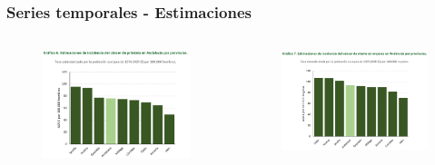\documentclass{beamer}
\begin{document}
\begin{frame}
\begin{columns}
\begin{column}{0.5\textwidth}
\begin{figure}
			\end{figure}
		\end{column}
	\end{columns}

\end{frame}



\begin{frame}\frametitle{Series temporales - Estimaciones}
	
	\begin{columns}
		\begin{column}{0.5\textwidth}
			\begin{figure}
				\centering
				\includegraphics[width=.98\textwidth]{images/estimaciones_hombres2.png}
			\end{figure}
		\end{column}
		\begin{column}{0.5\textwidth}
			\begin{figure}
				\centering
				\includegraphics[width=1.02\textwidth]{images/estimaciones_mujeres2.png}
			\end{figure}
		\end{column}
	\end{columns}
	
\end{frame}
\end{document}
